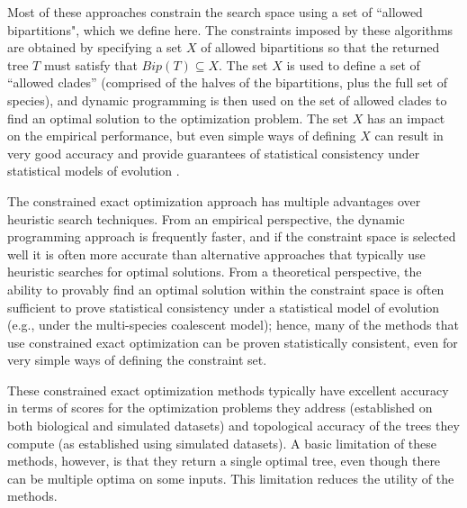 Most of these  approaches constrain the search space using  a set of ``allowed bipartitions", which we define here.
The constraints imposed by these algorithms are obtained by specifying a set $X$ of allowed bipartitions so that the returned tree $T$ must satisfy that $Bip(T) \subseteq  X$.
The set $X$ is used to define a set of ``allowed clades'' (comprised of the halves of the bipartitions, plus the full set of species), and dynamic programming is then used on the set of allowed clades  to  find an optimal solution to the optimization problem.  
The set $X$ has an impact on the empirical performance, but even simple ways of defining $X$ can result in very good accuracy and provide guarantees of statistical consistency under statistical models of evolution \cite{mirarab2015astral,vachaspati2017fastrfs}.

The constrained exact optimization approach has multiple advantages over heuristic search techniques. 
From an empirical perspective, the dynamic programming approach is frequently faster, and if the constraint space is selected well it is often more accurate than alternative approaches that typically use heuristic searches for optimal solutions.
From a theoretical perspective, the ability to provably find an optimal solution within the constraint space is often sufficient to prove statistical consistency under a statistical model of evolution (e.g., under the multi-species coalescent model); hence, many of the methods that use constrained exact optimization can be proven statistically consistent, even for very simple ways of defining the constraint set. 

These constrained exact optimization methods typically have excellent accuracy in terms of  scores for the optimization problems they address (established on both biological and simulated datasets) and topological accuracy of the trees they compute (as established using simulated datasets).
A basic limitation of these methods, however, is that they return a single optimal tree, even though there can be multiple optima on some inputs.
This limitation reduces the utility of the methods.


